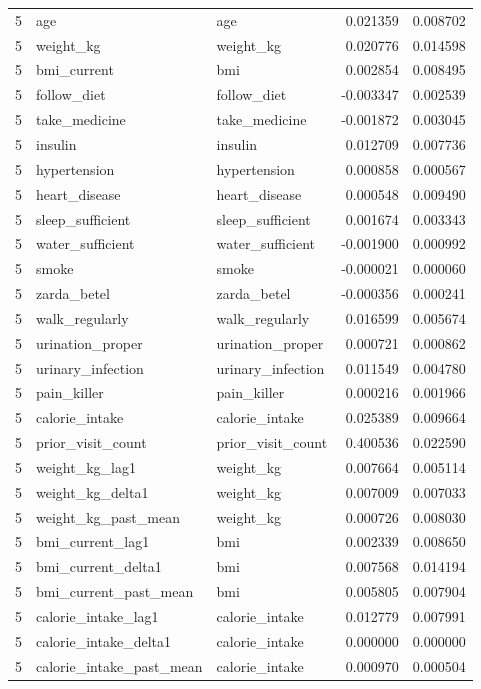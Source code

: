 \begin{longtable}{rllrr}
5 & age & age & 0.021359 & 0.008702 \\
5 & weight\_kg & weight\_kg & 0.020776 & 0.014598 \\
5 & bmi\_current & bmi & 0.002854 & 0.008495 \\
5 & follow\_diet & follow\_diet & -0.003347 & 0.002539 \\
5 & take\_medicine & take\_medicine & -0.001872 & 0.003045 \\
5 & insulin & insulin & 0.012709 & 0.007736 \\
5 & hypertension & hypertension & 0.000858 & 0.000567 \\
5 & heart\_disease & heart\_disease & 0.000548 & 0.009490 \\
5 & sleep\_sufficient & sleep\_sufficient & 0.001674 & 0.003343 \\
5 & water\_sufficient & water\_sufficient & -0.001900 & 0.000992 \\
5 & smoke & smoke & -0.000021 & 0.000060 \\
5 & zarda\_betel & zarda\_betel & -0.000356 & 0.000241 \\
5 & walk\_regularly & walk\_regularly & 0.016599 & 0.005674 \\
5 & urination\_proper & urination\_proper & 0.000721 & 0.000862 \\
5 & urinary\_infection & urinary\_infection & 0.011549 & 0.004780 \\
5 & pain\_killer & pain\_killer & 0.000216 & 0.001966 \\
5 & calorie\_intake & calorie\_intake & 0.025389 & 0.009664 \\
5 & prior\_visit\_count & prior\_visit\_count & 0.400536 & 0.022590 \\
5 & weight\_kg\_lag1 & weight\_kg & 0.007664 & 0.005114 \\
5 & weight\_kg\_delta1 & weight\_kg & 0.007009 & 0.007033 \\
5 & weight\_kg\_past\_mean & weight\_kg & 0.000726 & 0.008030 \\
5 & bmi\_current\_lag1 & bmi & 0.002339 & 0.008650 \\
5 & bmi\_current\_delta1 & bmi & 0.007568 & 0.014194 \\
5 & bmi\_current\_past\_mean & bmi & 0.005805 & 0.007904 \\
5 & calorie\_intake\_lag1 & calorie\_intake & 0.012779 & 0.007991 \\
5 & calorie\_intake\_delta1 & calorie\_intake & 0.000000 & 0.000000 \\
5 & calorie\_intake\_past\_mean & calorie\_intake & 0.000970 & 0.000504 \\

\end{longtable}
